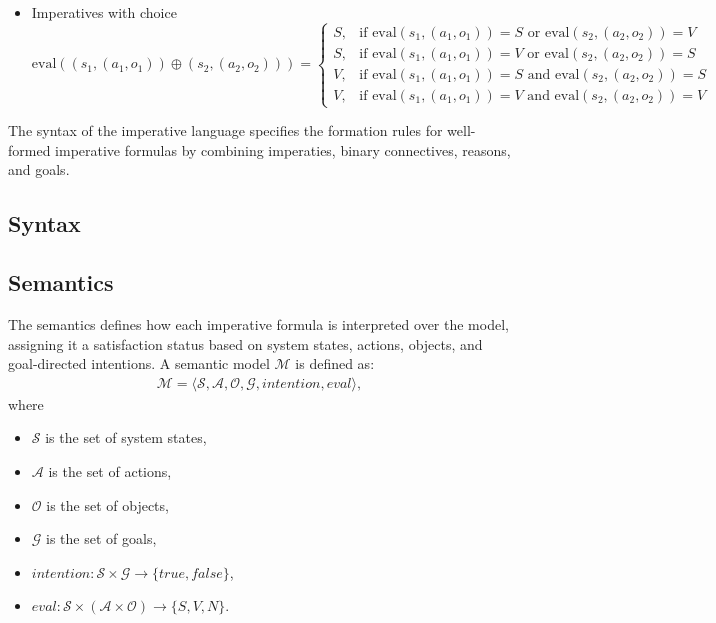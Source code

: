\documentclass[a4paper,11pt]{lmcs}
\begin{document}
\begin{itemize}
\item Imperatives with choice
\[
\text{eval}((s_1, (a_1, o_1)) \oplus (s_2, (a_2, o_2))) =
\begin{cases}
S, & \text{if } \text{eval}(s_1, (a_1, o_1)) = S
  \text{ or } \text{eval}(s_2, (a_2, o_2)) = V  \\[1.5ex]
S, & \text{if } \text{eval}(s_1, (a_1, o_1)) = V
  \text{ or } \text{eval}(s_2, (a_2, o_2)) = S  \\[1.5ex]
V, & \text{if } \text{eval}(s_1, (a_1, o_1)) = S
  \text{ and } \text{eval}(s_2, (a_2, o_2)) = S \\[1.5ex]
V, & \text{if } \text{eval}(s_1, (a_1, o_1)) = V
  \text{ and } \text{eval}(s_2, (a_2, o_2)) = V
\end{cases}
\]


\end{itemize}
The syntax of the imperative language specifies the formation rules for well-formed imperative formulas by combining imperaties, binary connectives, reasons, and goals.
\subsection{Syntax}

\subsection{Semantics}
The semantics defines how each imperative formula is interpreted over the model, assigning it a satisfaction status based on system states, actions, objects, and goal-directed intentions.
A semantic model \(\mathcal{M}\) is defined as:
\begin{eqnarray}
\label{eq:model}
\mathcal{M} = \langle \mathcal{S}, \mathcal{A}, \mathcal{O}, \mathcal{G}, intention, eval \rangle,
\end{eqnarray}
where
\begin{itemize}
    \item \(\mathcal{S}\) is the set of system states,
    \item \(\mathcal{A}\) is the set of actions,
    \item \(\mathcal{O}\) is the set of objects,
    \item \(\mathcal{G}\) is the set of goals,
    \item \(intention : \mathcal{S} \times \mathcal{G} \to \{ true, false \}\),
    \item \(eval : \mathcal{S} \times (\mathcal{A} \times \mathcal{O}) \to \{ S, V, N \}\).
\end{itemize}
\end{document}
